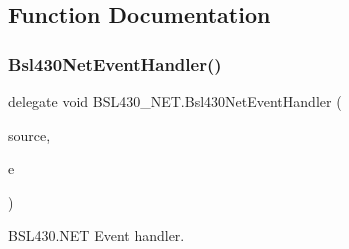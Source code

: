 \subsection{Function Documentation}
\mbox{\label{namespace_b_s_l430___n_e_t_a98dbd2acd09405042ee92547353c9f81}} 
\subsubsection{\texorpdfstring{Bsl430NetEventHandler()}{Bsl430NetEventHandler()}}
{\footnotesize\ttfamily delegate void B\+S\+L430\+\_\+\+N\+E\+T.\+Bsl430\+Net\+Event\+Handler (\begin{DoxyParamCaption}\item[{object}]{source,  }\item[{\mbox{\hyperlink{class_b_s_l430___n_e_t_1_1_bsl430_net_event_args}{Bsl430\+Net\+Event\+Args}}}]{e }\end{DoxyParamCaption})}



B\+S\+L430.\+N\+ET Event handler. 

